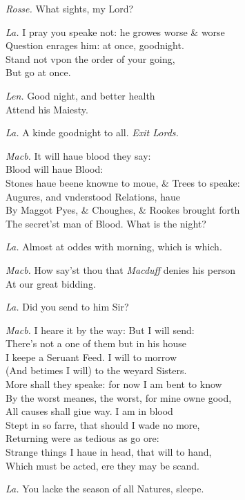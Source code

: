 \documentclass[12pt]{sides}
\newcommand{\elStageDir}[1]{\hfill\textit{#1}}
\newcommand{\dia}[1]{\hskip 15pt\textit{#1}\hskip 6pt}
\begin{document}
\begin{multicols}{2}
            \dia{Rosse.} What sights, my Lord?

            \dia{La.} I pray you speake not: he growes worse \& worse \\ Question enrages him: at once, goodnight. \\ Stand not vpon the order of your going, \\ But go at once.

            \dia{Len.} Good night, and better health \\ Attend his Maiesty.

            \dia{La.} A kinde goodnight to all. \elStageDir{Exit Lords.}

            \dia{Macb.} It will haue blood they say: \\ Blood will haue Blood: \\ Stones haue beene knowne to moue, \& Trees to speake: \\ Augures, and vnderstood Relations, haue \\ By Maggot Pyes, \& Choughes, \& Rookes brought forth \\ The secret'st man of Blood. What is the night?

            \dia{La.} Almost at oddes with morning, which is which.

            \dia{Macb.} How say'st thou that \textit{Macduff} denies his person \\ At our great bidding.

            \dia{La.} Did you send to him Sir?

            \dia{Macb.} I heare it by the way: But I will send: \\ There's not a one of them but in his house \\ I keepe a Seruant Feed. I will to morrow \\ (And betimes I will) to the weyard Sisters. \\ More shall they speake: for now I am bent to know \\ By the worst meanes, the worst, for mine owne good, \\ All causes shall giue way. I am in blood \\ Stept in so farre, that should I wade no more, \\ Returning were as tedious as go ore: \\ Strange things I haue in head, that will to hand, \\ Which must be acted, ere they may be scand.

            \dia{La.} You lacke the season of all Natures, sleepe.


\end{multicols}
\end{document}
